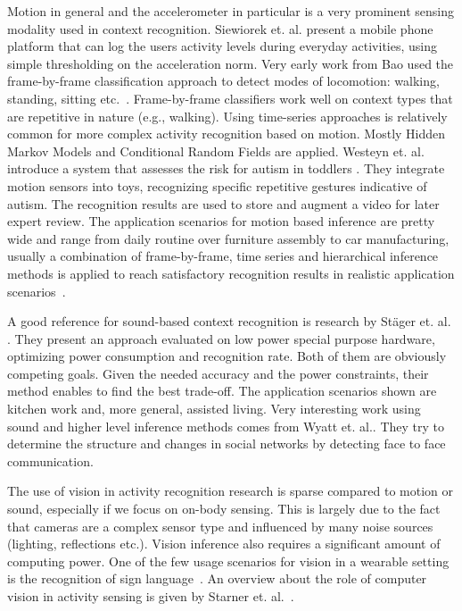 Motion in general and the accelerometer in particular is a very prominent sensing modality
used in context recognition. Siewiorek et. al. present
a mobile phone platform that can log the users activity levels 
during everyday activities, using simple thresholding on the acceleration norm. Very early work from Bao used the
frame-by-frame classification approach to detect  modes of locomotion: walking, standing, sitting etc.~\cite{bao2003physical}.
Frame-by-frame classifiers work well on context types that are repetitive in nature (e.g., walking). 
Using time-series approaches is relatively common for more complex activity recognition 
based on motion. Mostly Hidden Markov Models and Conditional Random Fields are applied.
Westeyn et. al. introduce a system that assesses the risk for autism in toddlers \cite{10.1109/ISWC.2005.45}. 
They integrate motion sensors into toys, recognizing specific repetitive gestures indicative of autism.
The recognition results are used to store and augment a video for later expert review. 
The application scenarios for motion based inference are pretty wide and range from daily routine over furniture assembly to car manufacturing,
usually a combination of frame-by-frame, time series and hierarchical inference methods is applied to reach satisfactory recognition results  in realistic application scenarios~\cite{Antifakos:2002p8030,Ogris:2008p7906}.

A good reference for sound-based context recognition is research by St\"ager et. al. 
\cite{Stager:2007wm}. They present an approach evaluated on low power special
purpose hardware, optimizing power consumption
and recognition rate. Both of them are obviously competing goals. 
Given the needed accuracy and the power constraints, their method enables to find
the best trade-off. The application scenarios shown are kitchen work and, more
general, assisted living. 
Very interesting work using sound and higher level inference methods
comes from Wyatt et. al.\cite{Wyatt:2007ta}. They try to determine the structure and changes
in social networks by detecting face to face communication.

The use of vision in activity recognition research is sparse compared to
motion or sound, especially if we focus on on-body sensing. This is largely
due to the fact that cameras are a complex sensor type and
influenced by many noise sources (lighting, reflections etc.).
Vision inference also requires a significant amount of computing power. 
One of the few usage scenarios for vision in a wearable setting is the recognition of sign language~\cite{starner1998vca}.
An overview about the role of computer vision in activity sensing is given
by Starner et. al.~\cite{starner1998vca}. 


